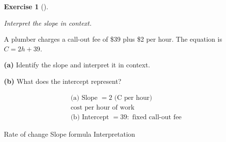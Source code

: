 \documentclass[
  letterpaper,
  DIV=11,
  numbers=noendperiod]{scrreprt}
\theoremstyle{definition}
\newtheorem{exercise}{Exercise}[chapter]
\theoremstyle{remark}
\begin{document}
\begin{exercise}[]\protect\hypertarget{exr-u7-12}{}\label{exr-u7-12}

\emph{Interpret the slope in context.}

A plumber charges a call-out fee of \$39 plus \$2 per hour. The equation
is \(C = 2h + 39\).

\textbf{(a)} Identify the slope and interpret it in context.

\textbf{(b)} What does the intercept represent?

\begin{tcolorbox}[enhanced jigsaw, opacitybacktitle=0.6, coltitle=black, arc=.35mm, colframe=quarto-callout-tip-color-frame, colback=white, bottomrule=.15mm, left=2mm, colbacktitle=quarto-callout-tip-color!10!white, titlerule=0mm, opacityback=0, title=\textcolor{quarto-callout-tip-color}{\faLightbulb}\hspace{0.5em}{🔍 View Solution}, leftrule=.75mm, breakable, rightrule=.15mm, bottomtitle=1mm, toptitle=1mm, toprule=.15mm]

\[
\begin{aligned}
\text{(a) Slope } = 2 \text{ (C per hour)} \\[4pt] \text{cost per hour of work} \\[4pt] \text{(b) Intercept } = 39: \text{ fixed call-out fee}
\end{aligned}
\]

\end{tcolorbox}

{Rate of change} {Slope formula} {Interpretation}

\end{exercise}
\end{document}
